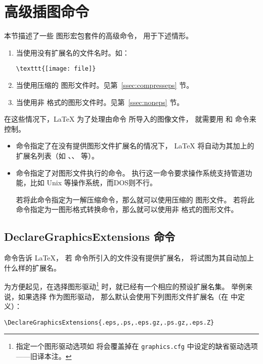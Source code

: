 \section{高级插图命令}\label{sec:adgraphcmd}
本节描述了一些 \LaTeXe{} 图形宏包套件的高级命令，
用于下述情形。
\begin{enumerate}
	\item 当使用没有扩展名的文件名时。如：
\begin{lstlisting}
\texttt{[image: file]}
\end{lstlisting}

	\item 当使用压缩的 图形文件时。见第~\ref{ssec:compresseps} 节。
	\item 当使用非 格式的图形文件时。见第~\ref{ssec:noneps} 节。
\end{enumerate}
在这些情况下，\LaTeX{} 为了处理由命令  所导入的图像文件，
就需要用  和  命令来控制。
\begin{itemize}
	\item {} 命令指定了在没有提供图形文件扩展名的情况下，
	\LaTeX{} 将自动为其加上的扩展名列表（如 、、 等）。
	\item {} 命令指定了对图形文件执行的命令。
	执行这一命令要求操作系统支持管道功能，比如 Unix 等操作系统，而DOS则不行。
	
	若将此命令指定为一解压缩命令，那么就可以使用压缩的  图形文件。
	若将此命令指定为一图形格式转换命令，那么就可以使用非 格式的图形文件。
\end{itemize}

\subsection{DeclareGraphicsExtensions 命令}\label{ssec:deextension}
 命令告诉 \LaTeX{}，
若  命令所引入的文件没有提供扩展名，
将试图为其自动加上什么样的扩展名。

为方便起见，在选择图形驱动\footnote{
	指定一个图形驱动选项如  将会覆盖掉在 \texttt{graphics.cfg} 中设定的缺省驱动选项——旧译本注。}
时，就已经有一个相应的预设扩展名集。
举例来说，如果选择  作为图形驱动，
那么默认会使用下列图形文件扩展名（在  中定义）：
\begin{lstlisting}
\DeclareGraphicsExtensions{.eps,.ps,.eps.gz,.ps.gz,.eps.Z}
\end{lstlisting}

